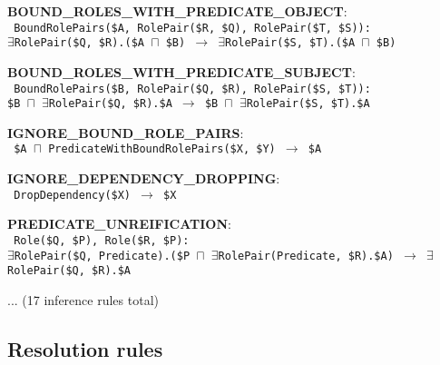 \documentclass[letterpaper]{article}
\begin{document}
\small{
\begin{flushleft}
\begin{flushleft}
\noindent \textbf{BOUND\_ROLES\_WITH\_PREDICATE\_OBJECT}: \\
\texttt{
BoundRolePairs(\$A, RolePair(\$R, \$Q), RolePair(\$T, \$S)):  \\
$\exists$RolePair(\$Q, \$R).(\$A $\sqcap$ \$B) $\rightarrow$ $\exists$RolePair(\$S, \$T).(\$A $\sqcap$ \$B)
}
\end{flushleft}
\begin{flushleft}
\noindent \textbf{BOUND\_ROLES\_WITH\_PREDICATE\_SUBJECT}: \\
\texttt{
BoundRolePairs(\$B, RolePair(\$Q, \$R), RolePair(\$S, \$T)):  \\
\$B $\sqcap$ $\exists$RolePair(\$Q, \$R).\$A $\rightarrow$ \$B $\sqcap$ $\exists$RolePair(\$S, \$T).\$A
}
\end{flushleft}
\begin{flushleft}
\noindent \textbf{IGNORE\_BOUND\_ROLE\_PAIRS}: \\
\texttt{
\$A $\sqcap$ PredicateWithBoundRolePairs(\$X, \$Y) $\rightarrow$ \$A
}
\end{flushleft}
\begin{flushleft}
\noindent \textbf{IGNORE\_DEPENDENCY\_DROPPING}: \\
\texttt{
DropDependency(\$X) $\rightarrow$ \$X
}
\end{flushleft}
\begin{flushleft}
\noindent \textbf{PREDICATE\_UNREIFICATION}: \\
\texttt{
Role(\$Q, \$P), Role(\$R, \$P):  \\
$\exists$RolePair(\$Q, Predicate).(\$P $\sqcap$ $\exists$RolePair(Predicate, \$R).\$A) $\rightarrow$ $\exists$RolePair(\$Q, \$R).\$A
}
\end{flushleft}
\end{flushleft}
}

... (17 inference rules total)

\subsection{Resolution rules}
\end{document}
